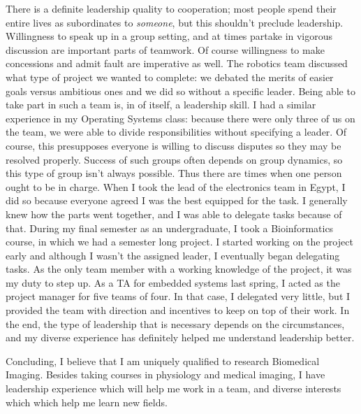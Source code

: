 \documentclass[12pt]{article}
\begin{document}
There is a definite leadership quality to cooperation; 
most people spend their entire lives as 
subordinates to \emph{someone}, but this shouldn't preclude leadership.
Willingness to speak up in a group setting, and at times partake
in vigorous discussion are important parts of teamwork. Of course
willingness to make concessions and admit fault are imperative as well.
The robotics team discussed what
type of project we wanted to complete: we debated the merits of
easier goals versus ambitious ones and we did so without a specific
leader. Being able to take part in such a team is, in of itself,
a leadership skill. I had a similar experience in my Operating
Systems class: because there were only three of us on the team,
we were able to divide responsibilities without specifying a leader.
Of course, this presupposes everyone is willing to discuss
disputes so they may be resolved properly. Success of 
such groups often depends on group dynamics, so this type of
group isn't always possible.  Thus there are times when one person
ought to be in charge. When I took the lead of the electronics
team in Egypt, I did so because everyone agreed I was the best 
equipped for the task. I generally knew how the parts went together,
and I was able to delegate tasks because of that. During my
final semester as an undergraduate, I took a Bioinformatics course,
in which we had a semester long project.
I started working on the project early 
and although I wasn't the assigned leader, I 
eventually began delegating tasks. As the only team member
with a working knowledge of the project, it was my duty to
step up.  As a TA for embedded systems last spring, I acted
as the project manager for five teams of four. In that case, I
delegated very little, but I provided the team with direction
and incentives to keep on top of their work.
In the end, the type of leadership that is necessary depends on the 
circumstances, and my diverse experience has definitely
helped me understand leadership better.

Concluding, I believe that I am uniquely qualified to 
research Biomedical Imaging. Besides taking courses in
physiology and medical imaging, I have leadership
experience which will help me work in a team,
and diverse interests which which help me learn new fields.
\end{document}
